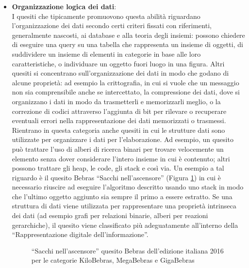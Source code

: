 \documentclass[12pt]{report}
\begin{document}
\begin{itemize}
	\item \textbf{Organizzazione logica dei dati}: 
	\\
	I quesiti che tipicamente promuovono questa abilità riguardano l'organizzazione dei dati secondo certi criteri fissati con riferimenti, generalmente nascosti, ai database e alla teoria degli insiemi: possono chiedere di eseguire una query su una tabella che rappresenta un insieme di oggetti, di suddividere un insieme di elementi in categorie in base alle loro caratteristiche, o individuare un oggetto fuori luogo in una figura.
	Altri quesiti si concentrano sull'organizzazione dei dati in modo che godano di alcune proprietà: ad esempio la crittografia, in cui si vuole che un messaggio non sia comprensibile anche se intercettato, la compressione dei dati, dove si organizzano i dati in modo da trasmetterli e memorizzarli meglio, o la correzione di codici attraverso l'aggiunta di bit per rilevare o recuperare eventuali errori nella rappresentazione dei dati memorizzati o trasmessi.
	Rientrano in questa categoria anche quesiti in cui le strutture dati sono utilizzate per organizzare i dati per l'elaborazione. Ad esempio, un quesito può trattare l'uso di alberi di ricerca binari per trovare velocemente un elemento senza dover considerare l'intero insieme in cui è contenuto; altri possono trattare gli heap, le code, gli stack e così via. 
	Un esempio a tal riguardo è il quesito Bebras ``Sacchi nell'ascensore'' (Figura \ref{sacchi_ascensore}) in cui è necessario riuscire ad eseguire l'algoritmo descritto usando uno stack in modo che l'ultimo oggetto aggiunto sia sempre il primo a essere estratto.
	Se una struttura di dati viene utilizzata per rappresentare una proprietà intrinseca dei dati (ad esempio grafi per relazioni binarie, alberi per reazioni gerarchiche), il quesito viene classificato più adeguatamente all'interno della ``Rappresentazione digitale dell'informazione''.
	
		\begin{figure}[h]
		\centering
		\caption{``Sacchi nell'ascensore'' quesito Bebras dell'edizione italiana 2016 per le categorie KiloBebras, MegaBebras e GigaBebras}\label{sacchi_ascensore}
	\end{figure}


\end{itemize}
\end{document}
